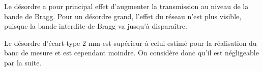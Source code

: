 Le désordre a pour principal effet d'augmenter la transmission au niveau de la bande de Bragg. Pour un désordre grand, l'effet du réseau n'est plus visible, puisque la bande interdite de Bragg va jusqu'à disparaître.

Le désordre d'écart-type 2 mm est supérieur à celui estimé pour la réalisation du banc de mesure et est cependant moindre. On considère donc qu'il est négligeable par la suite.



